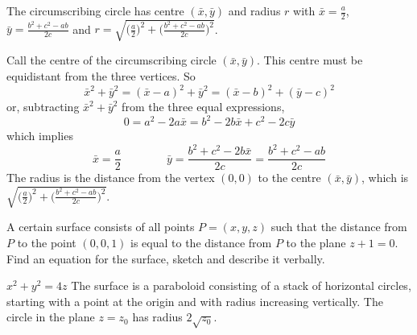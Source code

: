 \begin{answer}
The circumscribing circle has centre $(\bar x,\bar y)$ and radius $r$
with $\bar x=\frac{a}{2}$, $\bar y=\frac{b^2+c^2-ab}{2c}$ and
$r=\sqrt{\big(\frac{a}{2}\big)^2+\big(\frac{b^2+c^2-ab}{2c}\big)^2}$.
\end{answer}


\begin{solution}
Call the centre of the circumscribing circle 
$(\bar x,\bar y)$. This centre must be equidistant from the three vertices.
So
\begin{equation*}
\bar x^2+\bar y^2=(\bar x-a)^2+\bar y^2=(\bar x-b)^2+(\bar y-c)^2 
\end{equation*}
or, subtracting $\bar x^2+\bar y^2$ from the three equal expressions,
\begin{equation*}
0=a^2-2a\bar x=b^2-2b\bar x+c^2-2c\bar y
\end{equation*}
which implies
\begin{equation*}
\bar x=\frac{a}{2}\qquad\qquad \bar y
=\frac{b^2+c^2-2b\bar x}{2c}=\frac{b^2+c^2-ab}{2c}
\end{equation*}
The radius is the distance from the vertex $(0,0)$ to the centre 
$(\bar x,\bar y)$, which is
$\sqrt{\big(\frac{a}{2}\big)^2+\big(\frac{b^2+c^2-ab}{2c}\big)^2}$.

\end{solution}

\begin{question} [M200 2001A] %
A certain surface consists of all points $P=(x,y,z)$
such that the distance from $P$ to the point $(0,0,1)$ is equal to the
distance from $P$ to the plane $z+1=0$. Find an equation for the surface,
sketch and describe it verbally.
\end{question}

%

\begin{answer}
$x^2+y^2=4z$
The surface is a paraboloid consisting of a stack of horizontal circles, starting with a point at the origin and with radius increasing vertically.
The circle in the plane $z=z_0$ has radius $2\sqrt{z_0}$.
\end{answer}

